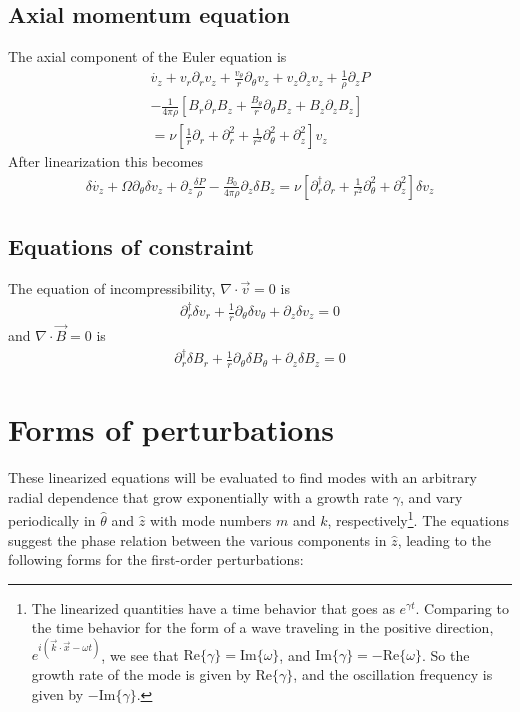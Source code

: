 \documentclass[letterpaper]{article}
\begin{document}
\subsection{Axial momentum equation}
The axial component of the Euler equation is
\begin{align}
\dot{v_z} + v_r \partial_r v_z + \frac{v_\theta}{r}\partial_\theta v_z
 + v_z \partial_z v_z + \frac{1}{\rho}\partial_z P
\nonumber \\
-\frac{1}{4\pi\rho}\left[B_r\partial_r B_z
 + \frac{B_\theta}{r}\partial_\theta B_z + B_z \partial_z B_z \right]
\nonumber \\
=\nu\left[\frac{1}{r}\partial_r + \partial_r^2
 + \frac{1}{r^2}\partial_\theta^2 + \partial_z^2\right]v_z
\end{align}
After linearization this becomes
\begin{align}
\delta\dot{v_z} + \Omega \partial_\theta \delta v_z
 + \partial_z \frac{\delta P}{\rho} 
 - \frac{B_0}{4\pi\rho} \partial_z \delta B_z
 = \nu\left[\partial_r^\dagger \partial_r + \frac{1}{r^2}\partial_\theta^2
 + \partial_z^2\right]\delta v_z
\end{align}

\subsection{Equations of constraint}

The equation of incompressibility, $\nabla\cdot\vec{v}=0$ is
\begin{align}
\partial_r^\dagger \delta v_r + \frac{1}{r}\partial_\theta \delta v_\theta
 + \partial_z \delta v_z = 0
\end{align}
and $\nabla\cdot\vec{B}=0$ is
\begin{align}
\partial_r^\dagger \delta B_r + \frac{1}{r}\partial_\theta \delta B_\theta
 + \partial_z \delta B_z = 0
\end{align}

\section{Forms of perturbations}

These linearized equations will be evaluated to find modes with an
arbitrary radial dependence that grow exponentially with a growth rate
$\gamma$, and vary periodically in $\hat{\theta}$ and $\hat{z}$ with
mode numbers $m$ and $k$, respectively\footnote{The linearized quantities
have a time behavior that goes as $e^{\gamma t}$. Comparing to the
time behavior for the form of a wave traveling in the positive
direction, $e^{i(\vec{k} \cdot \vec{x} - \omega t)}$, we see that
$\mathrm{Re}\{\gamma\} = \mathrm{Im}\{\omega\}$, and
$\mathrm{Im}\{\gamma\} = -\mathrm{Re}\{\omega\}$. So the growth rate
of the mode is given by $\mathrm{Re}\{\gamma\}$, and the oscillation
frequency is given by $-\mathrm{Im}\{\gamma\}$.}.
The equations suggest the phase relation between the various
components in $\hat{z}$, leading to the following forms for the
first-order perturbations:
\end{document}
